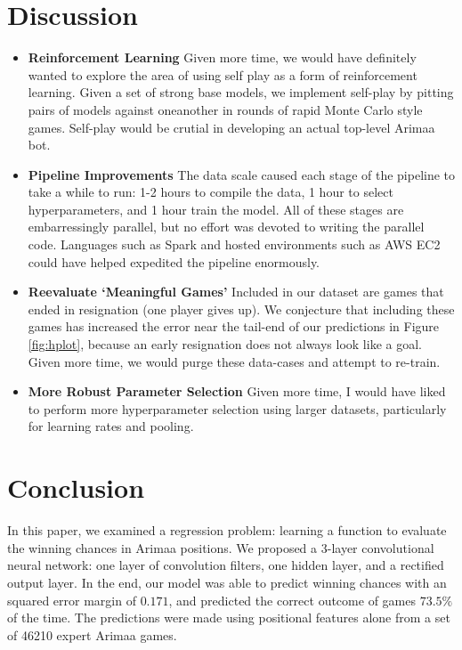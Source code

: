\documentclass{article}
\begin{document}
\section{Discussion}

\begin{itemize}
\item \textbf{Reinforcement Learning} Given more time, we would have definitely wanted to explore the area of using self play as a form of reinforcement learning.  Given a set of strong base models, we implement self-play by pitting pairs of models against oneanother in rounds of rapid Monte Carlo style games.  Self-play would be crutial in developing an actual top-level Arimaa bot.

\item \textbf{Pipeline Improvements} The data scale caused each stage of the pipeline to take a while to run:  1-2 hours to compile the data, 1 hour to select hyperparameters, and 1 hour train the model.  All of these stages are embarressingly parallel, but no effort was devoted to writing the parallel code.  Languages such as Spark \cite{spark} and hosted environments such as AWS EC2 could have helped expedited the pipeline enormously.

\item \textbf{Reevaluate `Meaningful Games'} Included in our dataset are games that ended in resignation (one player gives up).  We conjecture that including these games has increased the error near the tail-end of our predictions in Figure \ref{fig:hplot}, because an early resignation does not always look like a goal.  Given more time, we would purge these data-cases and attempt to re-train.

\item \textbf{More Robust Parameter Selection} Given more time, I would have liked to perform more hyperparameter selection using larger datasets, particularly for learning rates and pooling.
\end{itemize}

\section{Conclusion}

In this paper, we examined a regression problem: learning a function to evaluate the winning chances in Arimaa positions.  We proposed a 3-layer convolutional neural network: one layer of convolution filters, one hidden layer, and a rectified output layer.  In the end, our model was able to predict winning chances with an squared error margin of $0.171$, and predicted the correct outcome of games $73.5\%$ of the time.  The predictions were made using positional features alone from a set of 46210 expert Arimaa games.
\end{document}
